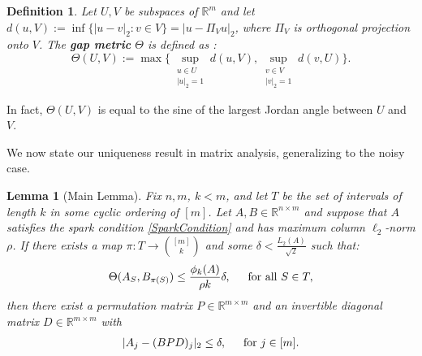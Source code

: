 \documentclass[journal, twocolumn]{IEEEtran}
\newtheorem{lemma}{Lemma}
\newtheorem{definition}{Definition}
\begin{document}
\begin{definition}\label{GapMetricDef}
Let $U, V$ be subspaces of $\mathbb{R}^m$ and let $d(u,V) := \inf\{|u-v|_2: v \in V\} = |u - \Pi_V u|_2$, where $\Pi_V$ is orthogonal projection onto $V$. The \textbf{gap metric} $\Theta$ is defined as \cite{Akhiezer13}:
\begin{equation*}
\Theta(U,V) := \max \big\{ \sup_{\substack{u \in U \\ |u|_2 = 1}} d(u,V), \sup_{\substack{v \in V \\ |v|_2 = 1}} d(v,U) \big\}.
\end{equation*}
\end{definition}

In fact, $\Theta(U,V)$ is equal to the sine of the largest Jordan angle between $U$ and $V$. 

We now state our uniqueness result in matrix analysis, generalizing \cite[Lem.~1]{Hillar15} to the noisy case.

\begin{lemma}[Main Lemma]\label{MainLemma}
Fix $n, m$, $k < m$, and let $T$ be the set of intervals of length $k$ in some cyclic ordering of $[m]$. Let $A, B \in \mathbb{R}^{n \times m}$ and suppose that $A$ satisfies the spark condition \eqref{SparkCondition} and has maximum column $\ell_2$-norm $\rho$.  If there exists a map $\pi: T \to {[m] \choose k}$ and some $\delta < \frac{L_{2}(A)}{\sqrt{2}}$ such that: 
\begin{equation}\label{GapUpperBound}
\Theta(A_{S}, B_{\pi(S)}) \leq \frac{ \phi_k(A) }{\rho k} \delta, \indent \text{for all } S \in T,
\end{equation}
%
then there exist a permutation matrix $P \in \mathbb{R}^{m \times m}$ and an invertible diagonal matrix $D \in \mathbb{R}^{m \times m}$ with
\begin{align}\label{MainLemmaBPD}
|A_j - (BPD)_j|_2 \leq \delta, \indent \text{for } j \in [m].
\end{align}
\end{lemma}
\end{document}
